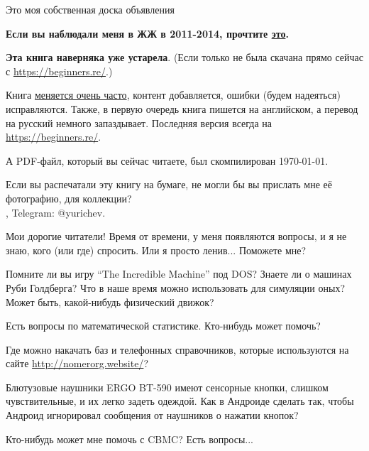 
\begin{center}
\LARGE{} Это моя собственная доска объявления \normalsize{}
\end{center}

\textbf{Если вы наблюдали меня в ЖЖ в 2011-2014, прочтите \href{http://link.yurichev.com/46001}{это}.}

\myhrule{}

\textbf{Эта книга наверняка уже устарела}.
(Если только не была скачана прямо сейчас с \url{https://beginners.re/}.)

Книга \href{\GitHubURL/commits/master}{меняется очень часто},
контент добавляется, ошибки (будем надеяться) исправляются.
Также, в первую очередь книга пишется на английском, а перевод на русский немного запаздывает.
Последняя версия всегда на \url{https://beginners.re/}.

А PDF-файл, который вы сейчас читаете, был скомпилирован \today{}.

\myhrule{}

Если вы распечатали эту книгу на бумаге, не могли бы вы прислать мне её фотографию, для коллекции?\\
\EMAIL{}, Telegram: @yurichev.

\myhrule{}

Мои дорогие читатели! Время от времени, у меня появляются вопросы, и я не знаю, кого (или где) спросить.
Или я просто ленив...
Поможете мне?

\myhrule{}

Помните ли вы игру ``The Incredible Machine'' под DOS?
Знаете ли о машинах Руби Голдберга?
Что в наше время можно использовать для симуляции оных?
Может быть, какой-нибудь физический движок?

\myhrule{}

Есть вопросы по математической статистике. Кто-нибудь может помочь?

\myhrule{}

Где можно накачать баз и телефонных справочников, которые используются на сайте \url{http://nomerorg.website/}?

\myhrule{}

Блютузовые наушники ERGO BT-590 имеют сенсорные кнопки, слишком чувствительные, и их легко задеть одеждой.
Как в Андроиде сделать так, чтобы Андроид игнорировал сообщения от наушников о нажатии кнопок?

\myhrule{}

Кто-нибудь может мне помочь с CBMC? Есть вопросы...

